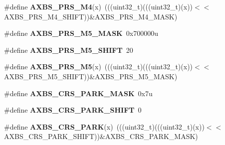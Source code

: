 \begin{DoxyCompactItemize}
\item 
\#define {\bfseries A\+X\+B\+S\+\_\+\+P\+R\+S\+\_\+\+M4}(x)~(((uint32\+\_\+t)(((uint32\+\_\+t)(x))$<$$<$A\+X\+B\+S\+\_\+\+P\+R\+S\+\_\+\+M4\+\_\+\+S\+H\+I\+FT))\&A\+X\+B\+S\+\_\+\+P\+R\+S\+\_\+\+M4\+\_\+\+M\+A\+SK)\hypertarget{group__AXBS__Register__Masks_ga637ca78f6d0fbd7625a0e14786664b44}{}\label{group__AXBS__Register__Masks_ga637ca78f6d0fbd7625a0e14786664b44}

\item 
\#define {\bfseries A\+X\+B\+S\+\_\+\+P\+R\+S\+\_\+\+M5\+\_\+\+M\+A\+SK}~0x700000u\hypertarget{group__AXBS__Register__Masks_ga6fe3afeef7171b168ddfa8341c88b0dc}{}\label{group__AXBS__Register__Masks_ga6fe3afeef7171b168ddfa8341c88b0dc}

\item 
\#define {\bfseries A\+X\+B\+S\+\_\+\+P\+R\+S\+\_\+\+M5\+\_\+\+S\+H\+I\+FT}~20\hypertarget{group__AXBS__Register__Masks_gabbebbaa7c8027c5ce2bfc3796cbdaac1}{}\label{group__AXBS__Register__Masks_gabbebbaa7c8027c5ce2bfc3796cbdaac1}

\item 
\#define {\bfseries A\+X\+B\+S\+\_\+\+P\+R\+S\+\_\+\+M5}(x)~(((uint32\+\_\+t)(((uint32\+\_\+t)(x))$<$$<$A\+X\+B\+S\+\_\+\+P\+R\+S\+\_\+\+M5\+\_\+\+S\+H\+I\+FT))\&A\+X\+B\+S\+\_\+\+P\+R\+S\+\_\+\+M5\+\_\+\+M\+A\+SK)\hypertarget{group__AXBS__Register__Masks_ga870ade9ac3018fe211f9574ca81b987a}{}\label{group__AXBS__Register__Masks_ga870ade9ac3018fe211f9574ca81b987a}

\item 
\#define {\bfseries A\+X\+B\+S\+\_\+\+C\+R\+S\+\_\+\+P\+A\+R\+K\+\_\+\+M\+A\+SK}~0x7u\hypertarget{group__AXBS__Register__Masks_gadfcbad36cb3a462a0ddbb4fd7ec4dc6d}{}\label{group__AXBS__Register__Masks_gadfcbad36cb3a462a0ddbb4fd7ec4dc6d}

\item 
\#define {\bfseries A\+X\+B\+S\+\_\+\+C\+R\+S\+\_\+\+P\+A\+R\+K\+\_\+\+S\+H\+I\+FT}~0\hypertarget{group__AXBS__Register__Masks_ga3beb82412a3e9fbd7712210fcb073d73}{}\label{group__AXBS__Register__Masks_ga3beb82412a3e9fbd7712210fcb073d73}

\item 
\#define {\bfseries A\+X\+B\+S\+\_\+\+C\+R\+S\+\_\+\+P\+A\+RK}(x)~(((uint32\+\_\+t)(((uint32\+\_\+t)(x))$<$$<$A\+X\+B\+S\+\_\+\+C\+R\+S\+\_\+\+P\+A\+R\+K\+\_\+\+S\+H\+I\+FT))\&A\+X\+B\+S\+\_\+\+C\+R\+S\+\_\+\+P\+A\+R\+K\+\_\+\+M\+A\+SK)\hypertarget{group__AXBS__Register__Masks_ga50b3beac990e12ab15d0dbe05235bcee}{}\label{group__AXBS__Register__Masks_ga50b3beac990e12ab15d0dbe05235bcee}


\end{DoxyCompactItemize}
